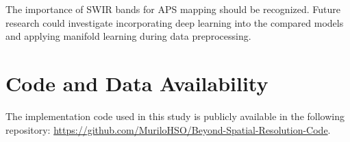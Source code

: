 \documentclass[journal]{IEEEtran}
\begin{document}
The importance of SWIR bands for APS mapping should be recognized. Future research could investigate incorporating deep learning into the compared models and applying manifold learning during data preprocessing.

\section*{Code and Data Availability}
The implementation code used in this study is publicly available in the following repository: \url{https://github.com/MuriloHSO/Beyond-Spatial-Resolution-Code}.



\end{document}
